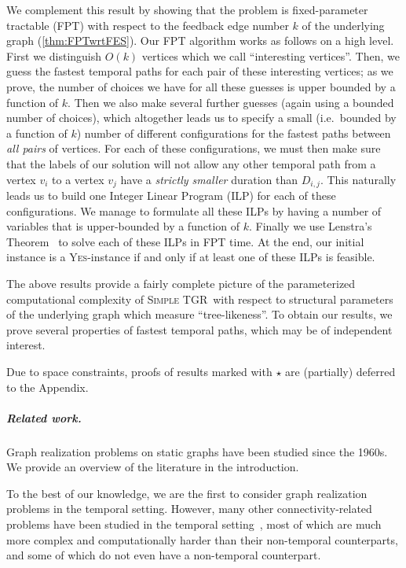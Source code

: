 \documentclass[a4paper,UKenglish,cleveref, autoref, thm-restate,anonymous]{lipics-v2021}
\newcommand{\deltaExact}{\textsc{Simple TGR}}
\begin{document}
We complement this result by showing that the problem is fixed-parameter tractable (FPT) with respect to the feedback edge number $k$ of the underlying graph (\cref{thm:FPTwrtFES}). 
Our FPT algorithm works as follows on a high level. 
First we distinguish $O(k)$ vertices which we call ``interesting vertices''. 
Then, we guess the fastest temporal paths for each pair of these interesting vertices; as we prove, the number of choices we have for all these guesses is upper bounded by a function of $k$. 
Then we also make several further guesses (again using a bounded number of choices), which altogether leads us to specify a small (i.e.~bounded by a function of $k$) number of different configurations for the fastest paths between \emph{all pairs} of vertices. For each of these configurations, we must then make sure that the labels of our solution will not allow any other temporal path from a vertex $v_i$ to a vertex $v_j$ have a \emph{strictly smaller} duration than $D_{i,j}$.
This naturally leads us to build one Integer Linear Program (ILP) for each of these configurations. We manage to formulate all these ILPs by having a number of variables that is upper-bounded by a function of $k$. Finally we use Lenstra's Theorem~\cite{Lenstra1983Integer} to solve each of these ILPs in FPT time. At the end, our initial instance is a \textsc{Yes}-instance if and only if at least one of these ILPs is feasible.




The above results provide a fairly complete picture of the parameterized computational complexity of \deltaExact\ with respect to structural parameters of the underlying graph which measure ``tree-likeness''. To obtain our results, we prove several properties of fastest temporal paths, which may be of independent interest.

Due to space constraints, proofs of results marked with $\star$ are (partially) deferred to the Appendix.


\subparagraph{Related work.} Graph realization problems on static graphs have been studied since the 1960s. We provide an overview of the literature in the introduction.

To the best of our knowledge, we are the first to consider graph realization problems in the temporal setting. However, many other connectivity-related problems have been studied in the temporal setting~\cite{Mertzios-transitivity21,Akrida-explorer-21,enright2021deleting,MolterRZ21,klobas2023interference,deligkas2022optimizing,erlebach2021temporal,Flu+19a,Zsc+19,CasteigtsCS22,FuchsleMNR22}, most of which are much more complex and computationally harder than their non-temporal counterparts, and some of which do not even have a non-temporal counterpart.
\end{document}
